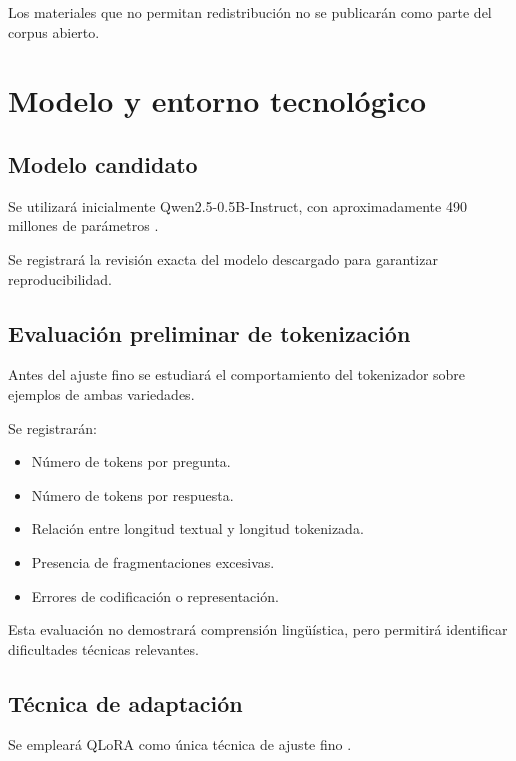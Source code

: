 Los materiales que no permitan redistribución no se publicarán como parte del corpus abierto.

\section{Modelo y entorno tecnológico}\label{modelo-y-entorno-tecnoluxf3gico}

\subsection{Modelo candidato}\label{modelo-candidato}

Se utilizará inicialmente Qwen2.5-0.5B-Instruct, con aproximadamente 490 millones de parámetros \parencite{QwenCard2024}.

Se registrará la revisión exacta del modelo descargado para garantizar reproducibilidad.

\subsection{Evaluación preliminar de tokenización}\label{evaluaciuxf3n-preliminar-de-tokenizaciuxf3n}

Antes del ajuste fino se estudiará el comportamiento del tokenizador sobre ejemplos de ambas variedades.

Se registrarán:

\begin{itemize}
\tightlist
\item
  Número de tokens por pregunta.
\item
  Número de tokens por respuesta.
\item
  Relación entre longitud textual y longitud tokenizada.
\item
  Presencia de fragmentaciones excesivas.
\item
  Errores de codificación o representación.
\end{itemize}

Esta evaluación no demostrará comprensión lingüística, pero permitirá identificar dificultades técnicas relevantes.

\subsection{Técnica de adaptación}\label{tuxe9cnica-de-adaptaciuxf3n}

Se empleará QLoRA como única técnica de ajuste fino \parencite{Dettmers2023}.

